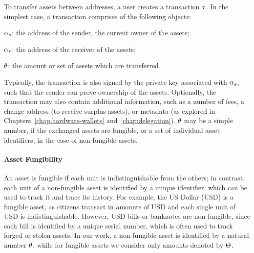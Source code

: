 To transfer assets between addresses, a user creates a transaction $\tau$. In
the simplest case, a transaction comprises of the following objects:
\begin{inparaenum}[i)]
    \item $\alpha_s$: the address of the sender, \ie the current owner of the
        assets;
    \item $\alpha_r$: the address of the receiver of the assets;
    \item $\theta$: the amount or set of assets which are transferred.
\end{inparaenum}
Typically, the transaction is also signed by the private key associated with
$\alpha_s$, such that the sender can prove ownership of the assets. Optionally,
the transaction may also contain additional information, such as a number of
fees, a change address (\ie to receive surplus assets), or metadata (as
explored in Chapters~\ref{chap:hardware-wallets} and~\ref{chap:delegation}).
$\theta$ may be a simple number, if the exchanged assets are fungible, or a set
of individual asset identifiers, in the case of non-fungible assets.

\paragraph{Asset Fungibility}
An asset is fungible if each unit is indistinguishable from the others; in
contrast, each unit of a non-fungible asset is identified by a unique
identifier, which can be used to track it and trace its history. For example,
the US Dollar (USD) is a fungible asset, as citizens transact in amounts of USD
and each single unit of USD is indistinguishable. However, USD bills or
banknotes are non-fungible, since each bill is identified by a unique serial
number, which is often used to track forged or stolen assets. In our work, a
non-fungible asset is identified by a natural number $\theta$, while for
fungible assets we consider only amounts denoted by $\Theta$.
